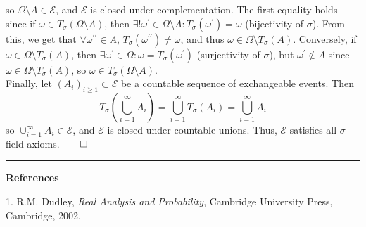 \documentclass[10pt]{article}
\newcommand{\bp}[1]{\left({#1}\right)}
\newcommand{\1}[1]{\mathbbm{1}_{#1}}
\newcommand{\mc}[1]{\mathcal{#1}}
\begin{document}
    so $\Omega\setminus A\in\mc{E}$, and $\mc{E}$ is closed under complementation. The first equality holds since if $\omega\in T_\sigma(\Omega\setminus A)$, then $\exists!\omega^\prime\in\Omega\setminus A:T_\sigma(\omega^\prime)=\omega$ (bijectivity of $\sigma$). From this, we get that $\forall \omega^{\prime\prime}\in A$, $T_\sigma(\omega^{\prime\prime})\neq\omega$, and thus $\omega\in\Omega\setminus T_\sigma(A)$.
    Conversely, if $\omega\in\Omega\setminus T_\sigma(A)$, then $\exists\omega^\prime\in\Omega:\omega= T_\sigma(\omega^\prime)$ (surjectivity of $\sigma$), but $\omega^\prime\notin A$ since $\omega\in\Omega\setminus T_\sigma(A)$, so $\omega\in T_\sigma(\Omega\setminus A)$.\\[5pt]
    Finally, let $(A_i)_{i\geq 1}\subset\mc{E}$ be a countable sequence of exchangeable events. Then
    \[T_\sigma\bp{\bigcup_{i=1}^\infty A_i}=\bigcup_{i=1}^\infty T_\sigma(A_i)=\bigcup_{i=1}^\infty A_i\]
    so $\cup_{i=1}^\infty A_i\in\mc{E}$, and $\mc{E}$ is closed under countable unions. Thus, $\mc{E}$ satisfies all $\sigma$-field axioms.\hfill{$\qed$}\\[5pt]
    \hrule
    \begin{center}
        {\bf\large References}
    \end{center}
    1. R.M. Dudley, {\it Real Analysis and Probability}, Cambridge University Press, Cambridge, 2002. \\[5pt]
\end{document}
